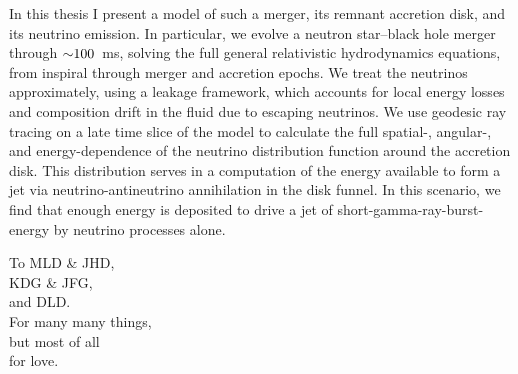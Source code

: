 \documentclass[12pt]{report}
\begin{document}
In this thesis I present a model of such a merger, its remnant accretion disk,
and its neutrino emission.
In particular, we evolve a neutron star--black hole merger through $\mathord{\sim}100$~ms,
solving the full general relativistic hydrodynamics equations,
from inspiral through merger and accretion epochs.
We treat the neutrinos approximately, using a leakage framework,
which accounts for local energy losses and composition drift in the fluid due
to escaping neutrinos.
We use geodesic ray tracing on a late time slice of the model to calculate the full
spatial-, angular-, and energy-dependence of the neutrino distribution function
around the accretion disk.
This distribution serves in a computation of the energy available to
form a jet via neutrino-antineutrino annihilation in the disk funnel.
In this scenario, we find that enough energy is deposited
to drive a jet of short-gamma-ray-burst-energy by neutrino processes alone.

\newpage

\tableofcontents
\newpage

\listoftables
{} %
\newpage

\listoffigures
{} %
\newpage

\begin{center}
  \null
  \vspace{2.7in}
  \bigskip
  To MLD \& JHD,\\
  KDG \& JFG,\\
  and DLD.\\
  For many many things,\\
  but most of all\\
  for love.
  \newpage
\end{center}









\newpage


\end{document}
